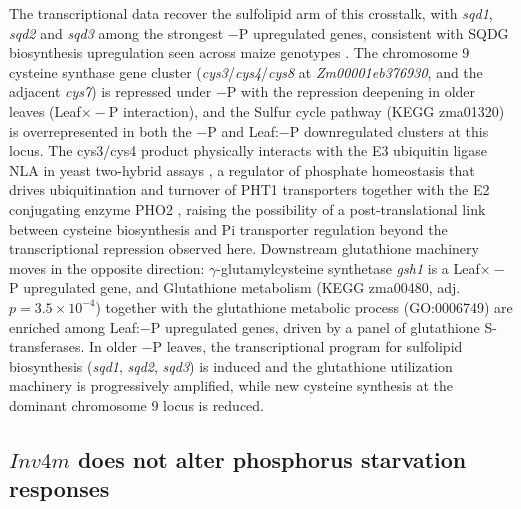 \documentclass[9pt,twocolumn,twoside]{rilabRxiv}
\newcommand{\invfour}{\textit{Inv4m}\xspace}
\begin{document}
The transcriptional data recover the sulfolipid arm of this crosstalk, with \textit{sqd1}, \textit{sqd2} and \textit{sqd3} among the strongest $-$P upregulated genes, consistent with SQDG biosynthesis upregulation seen across maize genotypes \citep{he2022}.
The chromosome 9 cysteine synthase gene cluster (\textit{cys3}/\textit{cys4}/\textit{cys8} at \textit{Zm00001eb376930}, and the adjacent \textit{cys7}) is repressed under $-$P with the repression deepening in older leaves (Leaf$\times -$P interaction), and the Sulfur cycle pathway (KEGG zma01320) is overrepresented in both the $-$P and Leaf:$-$P downregulated clusters at this locus.
The cys3/cys4 product physically interacts with the E3 ubiquitin ligase NLA in yeast two-hybrid assays \citep{liao2026}, a regulator of phosphate homeostasis that drives ubiquitination and turnover of PHT1 transporters together with the E2 conjugating enzyme PHO2 \citep{huang2013}, raising the possibility of a post-translational link between cysteine biosynthesis and Pi transporter regulation beyond the transcriptional repression observed here.
Downstream glutathione machinery moves in the opposite direction: $\gamma$-glutamylcysteine synthetase \textit{gsh1} is a Leaf$\times -$P upregulated gene, and Glutathione metabolism (KEGG zma00480, adj.\,$p = 3.5 \times 10^{-4}$) together with the glutathione metabolic process (GO:0006749) are enriched among Leaf:$-$P upregulated genes, driven by a panel of glutathione S-transferases.
In older $-$P leaves, the transcriptional program for sulfolipid biosynthesis (\textit{sqd1}, \textit{sqd2}, \textit{sqd3}) is induced and the glutathione utilization machinery is progressively amplified, while new cysteine synthesis at the dominant chromosome 9 locus is reduced.


\subsection*{$\invfour$ does not alter phosphorus starvation responses}
\end{document}
